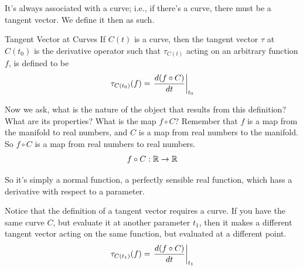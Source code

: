 		It's always associated with a curve; i.e., if there's a curve, there must be a tangent vector. We define it then as such.

		\begin{definition}{Tangent Vector at Curves}
			If $C(t)$ is a curve, then the tangent vector $\tau$ at $C(t_0)$ is the derivative operator
			such that $\tau_{C(t)}$ acting on an arbitrary function $f$, is defined to be
			\begin{equation}
				\label{eq:tangent_vector}
				\tau_{C(t_0)} (f) = 
				\eval{\dv{(f\circ C)}{t}}_{t_0}
			\end{equation}
		\end{definition}
	
		Now we ask, what is the nature of the object that results from this definition? What are its properties?
		What is the map $f\circ C$? Remember that $f$ is a map from the manifold to real numbers, and $C$ is a map
		from real numbers to the manifold. So $f\circ C$ is a map from real numbers to real numbers.
		\[
			f\circ C : \mathbb{R} \to \mathbb{R}
		\]

		So it's
		simply a normal function, a perfectly sensible real function, which hass a derivative
		with respect to a parameter.

		Notice that the definition of a tangent vector requires a curve. If you have the same curve $C$,
		but evaluate it at another parameter $t_1$, then it makes a different tangent vector acting on
		the same function, but evaluated at a different point.
		\[
			\tau_{C(t_1)} (f) = 
			\eval{\dv{(f\circ C)}{t}}_{t_1}
		\]

